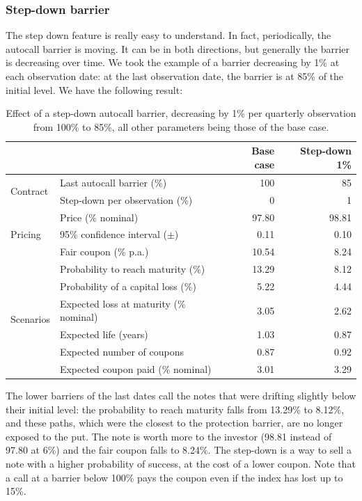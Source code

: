\documentclass[11pt,a4paper]{article}
\begin{document}
\clearpage
\subsubsection{Step-down barrier}

The step down feature is really easy to understand. In fact, periodically, the autocall barrier is moving. It can be
in both directions, but generally the barrier is decreasing over time. We took the example of a barrier decreasing
by 1\% at each observation date: at the last observation date, the barrier is at 85\% of the initial level.
We have the following result:

\begin{table}[htbp]
  \centering
  \small
  \begin{tabular}{llrr}
    \toprule
     & & \textbf{Base case} & \textbf{Step-down 1\%} \\
    \midrule
    \multirow{2}{*}{Contract}
      & Last autocall barrier (\%)          & 100   & 85 \\
      & Step-down per observation (\%)      & 0     & 1 \\
    \midrule
    \multirow{3}{*}{Pricing}
      & Price (\% nominal)                  & 97.80 & 98.81 \\
      & 95\% confidence interval ($\pm$)    & 0.11  & 0.10 \\
      & Fair coupon (\% p.a.)               & 10.54 & 8.24 \\
    \midrule
    \multirow{6}{*}{Scenarios}
      & Probability to reach maturity (\%)  & 13.29 & 8.12 \\
      & Probability of a capital loss (\%)  & 5.22  & 4.44 \\
      & Expected loss at maturity (\% nominal) & 3.05 & 2.62 \\
      & Expected life (years)               & 1.03  & 0.87 \\
      & Expected number of coupons          & 0.87  & 0.92 \\
      & Expected coupon paid (\% nominal)   & 3.01  & 3.29 \\
    \bottomrule
  \end{tabular}
  \caption{Effect of a step-down autocall barrier, decreasing by 1\% per
           quarterly observation from 100\% to 85\%, all other parameters
           being those of the base case.}
  \label{tab:athena-step-down}
\end{table}

The lower barriers of the last dates call the notes that were drifting slightly below their initial level: the
probability to reach maturity falls from 13.29\% to 8.12\%, and these paths, which were the closest to the
protection barrier, are no longer exposed to the put. The note is worth more to the investor (98.81 instead of 97.80
at 6\%) and the fair coupon falls to 8.24\%. The step-down is a way to sell a note with a higher probability of
success, at the cost of a lower coupon. Note that a call at a barrier below 100\% pays the coupon even if the index
has lost up to 15\%.
\end{document}
